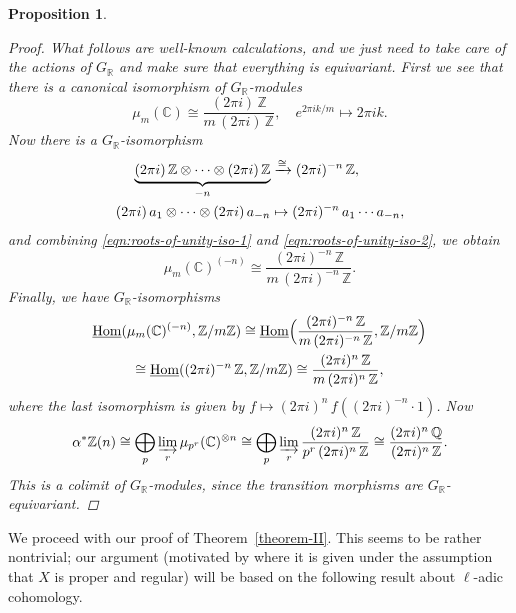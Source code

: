 \documentclass[leqno,12pt]{article}
\theoremstyle{plain}
\newtheorem{proposition}[theorem]{\indent\sc Proposition}
\theoremstyle{definition}
\DeclareMathOperator{\Hom}{Hom}
\newcommand{\ZZ}{\mathbb{Z}}
\newcommand{\QQ}{\mathbb{Q}}
\newcommand{\RR}{\mathbb{R}}
\newcommand{\CC}{\mathbb{C}}
\newcommand{\iHom}{\underline{\Hom}}
\begin{document}
\begin{proposition}
\begin{proof}
    What follows are well-known calculations, and we just need to take care of
    the actions of $G_\RR$ and make sure that everything is equivariant. First
    we see that there is a canonical isomorphism of $G_\RR$-modules
    \begin{equation}
      \label{eqn:roots-of-unity-iso-1}
      \mu_m (\CC) \cong \frac{(2\pi i) \, \ZZ}{m\,(2\pi i)\,\ZZ}, \quad
      e^{2\pi i k/m} \mapsto 2\pi i k.
    \end{equation}
    Now there is a $G_\RR$-isomorphism
    \begin{align}
      \label{eqn:roots-of-unity-iso-2}
      \underbrace{(2\pi i)\,\ZZ\otimes\cdots\otimes (2\pi i)\,\ZZ}_{-n} & \xrightarrow{\cong} (2\pi i)^{-n}\,\ZZ,\\
      \notag (2\pi i)\,a_1\otimes\cdots\otimes (2\pi i)\,a_{-n} & \mapsto (2\pi i)^{-n}\,a_1\cdots a_{-n},
    \end{align}
    and combining \eqref{eqn:roots-of-unity-iso-1}
    and \eqref{eqn:roots-of-unity-iso-2}, we obtain
    $$\mu_m (\CC)^{(-n)} \cong \frac{(2\pi i)^{-n} \, \ZZ}{m\,(2\pi i)^{-n}\,\ZZ}.$$
    Finally, we have $G_\RR$-isomorphisms
    \begin{multline*}
      \iHom (\mu_m (\CC)^{(-n)}, \ZZ/m\ZZ) \cong
      \iHom \Bigl(\frac{(2\pi i)^{-n} \, \ZZ}{m\,(2\pi i)^{-n}\,\ZZ}, \ZZ/m\ZZ\Bigr) \\
      \cong
      \iHom ((2\pi i)^{-n}\,\ZZ, \ZZ/m\ZZ) \cong
      \frac{(2\pi i)^n\,\ZZ}{m\,(2\pi i)^n\,\ZZ},
    \end{multline*}
    where the last isomorphism is given by
    $f \mapsto (2\pi i)^n \, f ((2\pi i)^{-n}\cdot 1)$.
    Now
    \[ \alpha^* \ZZ (n) \cong
    \bigoplus_p \varinjlim_r \mu_{p^r} (\CC)^{\otimes n} \cong
    \bigoplus_p \varinjlim_r \frac{(2\pi i)^n\,\ZZ}{p^r\,(2\pi i)^n\,\ZZ} \cong
    \frac{(2\pi i)^n\,\QQ}{(2\pi i)^n\,\ZZ}. \]
    This is a colimit of $G_\RR$-modules, since the transition morphisms are
    $G_\RR$-equivariant.
  \end{proof}
\end{proposition}

We proceed with our proof of Theorem~\ref{theorem-II}. This seems to be rather
nontrivial; our argument (motivated by \cite{Flach-Morin-2018} where it is given
under the assumption that $X$ is proper and regular) will be based on the
following result about $\ell$-adic cohomology.
\end{document}
